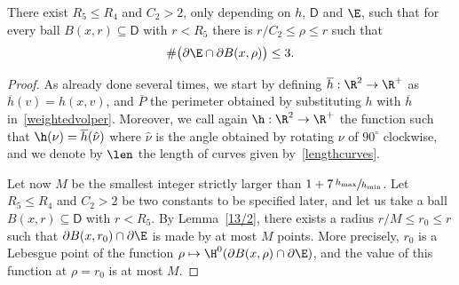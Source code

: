 \begin{lem}\label{atmost3}
There exist $R_5\leq R_4$ and $C_2>2$, only depending on $h$, $\mathsf{D}$ and $\E$, such that for every ball $B(x,r)\subseteq \mathsf{D}$ with $r< R_5$ there is $r/C_2 \leq \rho\leq r$ such that
\begin{equation}\label{thencons}
\#\bigl(\partial\E \cap \partial B(x,\rho) \bigr) \leq 3.
\end{equation}
\end{lem}
\begin{proof}
As already done several times, we start by defining $\overline h:\R^2\to\R^+$ as $\overline h(v)=h(x,v)$, and $\overline P$ the perimeter obtained by substituting $h$ with $\overline h$ in~\eqref{weightedvolper}. Moreover, we call again $\h:\R^2\to \R^+$ the function such that $\h(\nu)=\overline h(\hat \nu)$ where $\hat \nu$ is the angle obtained by rotating $\nu$ of $90^\circ$ clockwise, and we denote by $\len$ the length of curves given by~\eqref{lengthcurves}.

Let now $M$ be the smallest integer strictly larger than $1+7\,\sfrac{h_{\max}}{h_{\min}}$. Let $R_5\leq R_4$ and $C_2\!>\!2$ be two constants to be specified later, and let us take a ball \hbox{$B(x,r)\!\subseteq\! \mathsf{D}$} with $r< R_5$. By Lemma~\ref{13/2}, there exists a radius $r/M \leq r_0\leq r$ such that $\partial B(x,r_0)\cap \partial\E$ is made by at most $M$ points. More precisely, $r_0$ is a Lebesgue point of the function $\rho\mapsto\H^0(\partial B(x,\rho)\cap \partial\E)$, and the value of this function at $\rho=r_0$ is at most $M$.


\end{proof}
